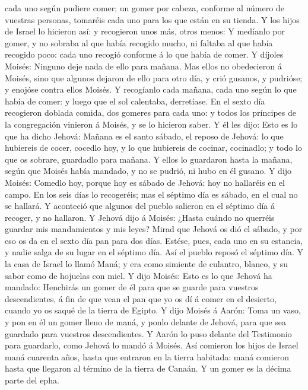 cada uno según pudiere comer; un gomer por cabeza, conforme al número de
vuestras personas, tomaréis cada uno para los que están en su tienda.
 Y los hijos de Israel lo hicieron así: y recogieron unos
más, otros menos:  Y medíanlo por gomer, y no sobraba al
que había recogido mucho, ni faltaba al que había recogido poco: cada
uno recogió conforme á lo que había de comer.  Y díjoles
Moisés: Ninguno deje nada de ello para mañana.  Mas ellos
no obedecieron á Moisés, sino que algunos dejaron de ello para otro día,
y crió gusanos, y pudrióse; y enojóse contra ellos Moisés.
 Y recogíanlo cada mañana, cada uno según lo que había de
comer: y luego que el sol calentaba, derretíase.  En el
sexto día recogieron doblada comida, dos gomeres para cada uno: y todos
los príncipes de la congregación vinieron á Moisés, y se lo hicieron
saber.  Y él les dijo: Esto es lo que ha dicho Jehová:
Mañana es el santo sábado, el reposo de Jehová: lo que hubiereis de
cocer, cocedlo hoy, y lo que hubiereis de cocinar, cocinadlo; y todo lo
que os sobrare, guardadlo para mañana.  Y ellos lo
guardaron hasta la mañana, según que Moisés había mandado, y no se
pudrió, ni hubo en él gusano.  Y dijo Moisés: Comedlo
hoy, porque hoy es sábado de Jehová: hoy no hallaréis en el campo.
 En los seis días lo recogeréis; mas el séptimo día es
sábado, en el cual no se hallará.  Y aconteció que
algunos del pueblo salieron en el séptimo día á recoger, y no hallaron.
 Y Jehová dijo á Moisés: ¿Hasta cuándo no querréis
guardar mis mandamientos y mis leyes?  Mirad que Jehová
os dió el sábado, y por eso os da en el sexto día pan para dos días.
Estése, pues, cada uno en su estancia, y nadie salga de su lugar en el
séptimo día.  Así el pueblo reposó el séptimo día.
 Y la casa de Israel lo llamó Maná; y era como simiente
de culantro, blanco, y su sabor como de hojuelas con miel.
 Y dijo Moisés: Esto es lo que Jehová ha mandado:
Henchirás un gomer de él para que se guarde para vuestros descendientes,
á fin de que vean el pan que yo os dí á comer en el desierto, cuando yo
os saqué de la tierra de Egipto.  Y dijo Moisés á Aarón:
Toma un vaso, y pon en él un gomer lleno de maná, y ponlo delante de
Jehová, para que sea guardado para vuestros descendientes.
 Y Aarón lo puso delante del Testimonio para guardarlo,
como Jehová lo mandó á Moisés.  Así comieron los hijos de
Israel maná cuarenta años, hasta que entraron en la tierra habitada:
maná comieron hasta que llegaron al término de la tierra de Canaán.
 Y un gomer es la décima parte del epha.

